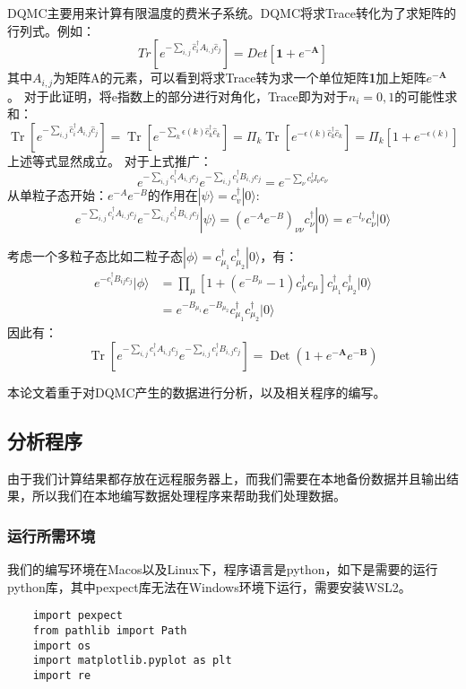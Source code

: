 DQMC主要用来计算有限温度的费米子系统。DQMC将求Trace转化为了求矩阵的行列式。例如：
$$Tr[e^{- \sum_{i,j}\widehat{c}^\dagger_i A_{i,j}\widehat{c}_j}]=Det[\textbf{1}+e^{-\textbf{A}}]$$
其中$A_{i,j}$为矩阵A的元素，可以看到将求Trace转为求一个单位矩阵\textbf{1}加上矩阵$e^{-\textbf{A}}$。
对于此证明，将e指数上的部分进行对角化，Trace即为对于$n_i=0,1$的可能性求和：
$$
\operatorname{Tr}\left[e^{-\sum_{i, j} \hat{c}_{i}^{\dagger} A_{i, j} \hat{c}_{j}}\right]=\operatorname{Tr}\left[e^{-\sum_{k} \epsilon(k) \hat{c}_{k}^{\dagger} \hat{c}_{k}}\right]=\Pi_{k} \operatorname{Tr}\left[e^{-\epsilon(k) \hat{c}_{k}^{\dagger} \hat{c}_{k}}\right]=\Pi_{k}\left[1+e^{-\epsilon(k)}\right]
$$
上述等式显然成立。
对于上式推广：
$$
e^{-\sum_{i, j} c_{i}^{\dagger} A_{i, j} c_{j}} e^{-\sum_{i, j} c_{i}^{\dagger} B_{i, j} c_{j}}=e^{-\sum_{\nu} c_{\nu}^{\dagger} l_{\nu} c_{\nu}}
$$
从单粒子态开始：$e^{-A}e^{-B}$的作用在$|\psi \rangle=c^{\dagger}_v|0\rangle$:
$$
e^{-\sum_{i, j} c_{i}^{\dagger} A_{i, j} c_{j}} e^{-\sum_{i, j} c_{i}^{\dagger} B_{i, j} c_{j}}|\psi\rangle=\left(e^{-A} e^{-B}\right)_{\nu \nu} c_{\nu}^{\dagger}|0\rangle=e^{-l_{\nu}} c_{\nu}^{\dagger}|0\rangle
$$

考虑一个多粒子态比如二粒子态$|\phi\rangle=c^\dagger _{\mu_1}c^\dagger _{\mu_2}|0\rangle$，有：
$$
\begin{aligned}
e^{-c_{i}^{\dagger} B_{i j} c_{j}}|\phi\rangle &=\prod_{\mu}\left[1+\left(e^{-B_{\mu}}-1\right) c_{\mu}^{\dagger} c_{\mu}\right] c_{\mu_{1}}^{\dagger} c_{\mu_{2}}^{\dagger}|0\rangle \\
&=e^{-B_{\mu_{1}}} e^{-B_{\mu_{2}}} c_{\mu_{1}}^{\dagger} c_{\mu_{2}}^{\dagger}|0\rangle
\end{aligned}
$$
因此有：
$$
\operatorname{Tr}\left[e^{-\sum_{i, j} c_{i}^{\dagger} A_{i, j} c_{j}} e^{-\sum_{i, j} c_{i}^{\dagger} B_{i, j} c_{j}}\right]=\operatorname{Det}\left(1+e^{-\mathbf{A}} e^{-\mathbf{B}}\right)
$$

本论文着重于对DQMC产生的数据进行分析，以及相关程序的编写。
\subsection{分析程序}
由于我们计算结果都存放在远程服务器上，而我们需要在本地备份数据并且输出结果，所以我们在本地编写数据处理程序来帮助我们处理数据。
\subsubsection{运行所需环境}
我们的编写环境在Macos以及Linux下，程序语言是python，如下是需要的运行python库，其中pexpect库无法在Windows环境下运行，需要安装WSL2。
\begin{lstlisting}
    import pexpect
    from pathlib import Path
    import os
    import matplotlib.pyplot as plt
    import re
\end{lstlisting}

